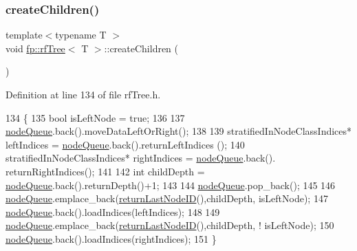 \subsubsection{\texorpdfstring{create\+Children()}{createChildren()}\hspace{0.1cm}{\footnotesize\ttfamily [2/2]}}
{\footnotesize\ttfamily template$<$typename T $>$ \\
void \hyperlink{classfp_1_1rfTree}{fp\+::rf\+Tree}$<$ T $>$\+::create\+Children (\begin{DoxyParamCaption}{ }\end{DoxyParamCaption})\hspace{0.3cm}{\ttfamily [inline]}}



Definition at line 134 of file rf\+Tree.\+h.


\begin{DoxyCode}
134                                             \{
135                     \textcolor{keywordtype}{bool} isLeftNode = \textcolor{keyword}{true};
136 
137                         \hyperlink{classfp_1_1rfTree_af72d0a2f930fd480dfb4858885c2df23}{nodeQueue}.back().moveDataLeftOrRight();
138 
139                     stratifiedInNodeClassIndices* leftIndices = \hyperlink{classfp_1_1rfTree_af72d0a2f930fd480dfb4858885c2df23}{nodeQueue}.back().returnLeftIndices
      ();
140                     stratifiedInNodeClassIndices* rightIndices = \hyperlink{classfp_1_1rfTree_af72d0a2f930fd480dfb4858885c2df23}{nodeQueue}.back().
      returnRightIndices();
141 
142                     \textcolor{keywordtype}{int} childDepth = \hyperlink{classfp_1_1rfTree_af72d0a2f930fd480dfb4858885c2df23}{nodeQueue}.back().returnDepth()+1;
143 
144                     \hyperlink{classfp_1_1rfTree_af72d0a2f930fd480dfb4858885c2df23}{nodeQueue}.pop\_back();
145 
146                     \hyperlink{classfp_1_1rfTree_af72d0a2f930fd480dfb4858885c2df23}{nodeQueue}.emplace\_back(\hyperlink{classfp_1_1rfTree_a1b8c04f3f3ce362d9627c2ca66d10efd}{returnLastNodeID}(),childDepth, 
      isLeftNode);
147                     \hyperlink{classfp_1_1rfTree_af72d0a2f930fd480dfb4858885c2df23}{nodeQueue}.back().loadIndices(leftIndices);
148 
149                     \hyperlink{classfp_1_1rfTree_af72d0a2f930fd480dfb4858885c2df23}{nodeQueue}.emplace\_back(\hyperlink{classfp_1_1rfTree_a1b8c04f3f3ce362d9627c2ca66d10efd}{returnLastNodeID}(),childDepth, !
      isLeftNode);
150                     \hyperlink{classfp_1_1rfTree_af72d0a2f930fd480dfb4858885c2df23}{nodeQueue}.back().loadIndices(rightIndices);
151                 \}
\end{DoxyCode}
